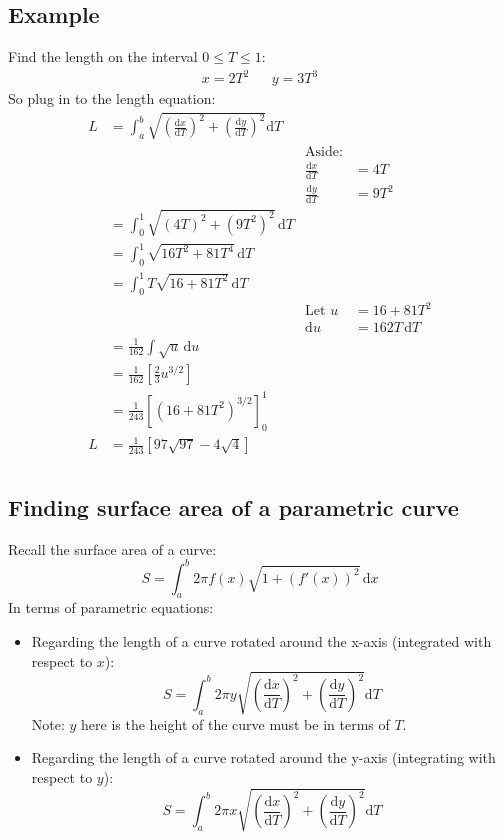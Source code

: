 \documentclass{report}
\begin{document}
    \subsection{Example}
        Find the length on the interval \(0 \leq T \leq 1\):
        \begin{align*}
            x = 2T^2 &&
            y = 3T^3
        \end{align*}
        So plug in to the length equation:
        \begin{align*}
            L &= \int_a^b \sqrt{\left(\frac{\mathrm{d}x}{\mathrm{d}T}\right)^2 + \left(\frac{\mathrm{d}y}{\mathrm{d}T}\right)^2} \mathrm{d}T \\
            && \text{Aside:} \\
            && \frac{\mathrm{d}x}{\mathrm{d}T} &= 4T \\
            && \frac{\mathrm{d}y}{\mathrm{d}T} &= 9T^2 \\
            &= \int_0^1 \sqrt{(4T)^2 + (9T^2)^2} \, \mathrm{d}T \\
            &= \int_0^1 \sqrt{16T^2 + 81T^4} \, \mathrm{d}T \\
            &= \int_0^1 T \sqrt{16 + 81T^2} \, \mathrm{d}T \\
            && \text{Let } u &= 16+ 81T^2 \\
            && \mathrm{d}u &= 162T \, \mathrm{d}T \\
            &= \frac{1}{162} \int \sqrt{u} \, \mathrm{d}u \\
            &= \frac{1}{162} \left[ \frac{2}{3} u^{3/2}\right] \\
            &= \frac{1}{243} \left[(16 + 81T^2)^{3/2} \right]_0^1 \\
            L &= \frac{1}{243} \left[ 97 \sqrt{97} - 4 \sqrt{4}\right] \\
        \end{align*}
    
    \subsection{Finding surface area of a parametric curve}
        Recall the surface area of a curve:
        \[S = \int_a^b 2 \pi f(x) \sqrt{1 + (f'(x)) ^2} \, \mathrm{d}x\]
        In terms of parametric equations:
        \begin{itemize}
            \item Regarding the length of a curve rotated around the x-axis (integrated with respect to \(x\)):
            \[S = \int_a^b 2 \pi y \sqrt{\left(\frac{\mathrm{d}x}{\mathrm{d}T}\right)^2 + \left(\frac{\mathrm{d}y}{\mathrm{d}T}\right)^2} \mathrm{d}T\]
            Note: \(y\) here is the height of the curve must be in terms of \(T\).
            \item Regarding the length of a curve rotated around the y-axis (integrating with respect to \(y\)):
            \[S = \int_a^b 2 \pi x \sqrt{\left(\frac{\mathrm{d}x}{\mathrm{d}T}\right)^2 + \left(\frac{\mathrm{d}y}{\mathrm{d}T}\right)^2} \mathrm{d}T\]
        \end{itemize}
\end{document}
